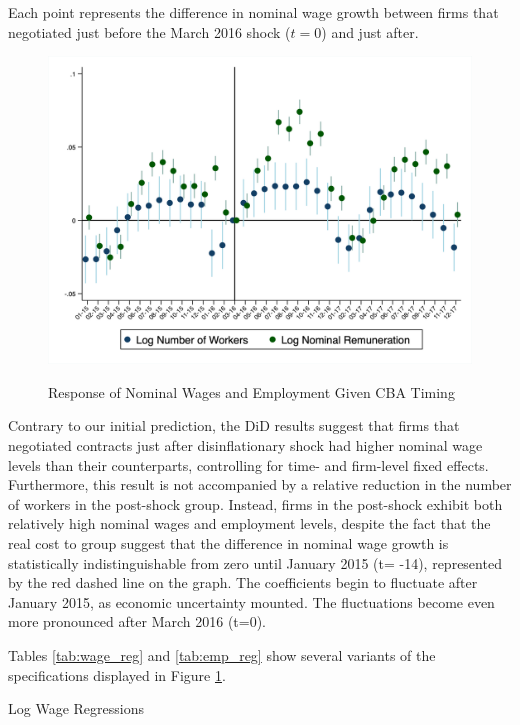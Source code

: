 \documentclass[12pt]{article}
\begin{document}
		 Each point represents the difference in nominal wage growth between firms that negotiated just before the March 2016 shock ($t=0$) and just after.
		\begin{figure}[!ht]
			\centering
			\caption{Response of Nominal Wages and Employment Given CBA Timing}
			\includegraphics[scale = .375]{tables-figures/DiD_Plots_Weighted_Employment_Rem.png}
			\label{fig:RegressionResults}
		\end{figure}
		Contrary to our initial prediction, the DiD results suggest that firms that negotiated contracts just after disinflationary shock had higher nominal wage levels than their counterparts, controlling for time- and firm-level fixed effects. Furthermore, this result is not accompanied by a relative reduction in the number of workers in the post-shock group. Instead, firms in the post-shock exhibit both relatively high nominal wages and employment levels, despite the fact that the real cost to group suggest that the difference in nominal wage growth is statistically indistinguishable from zero until January 2015 (t= -14), represented by the red dashed line on the graph. The coefficients begin to fluctuate after January 2015, as economic uncertainty mounted. The fluctuations become even more pronounced after March 2016 (t=0).


	Tables \ref{tab:wage_reg} and \ref{tab:emp_reg} show several variants of the specifications displayed in Figure \ref{fig:RegressionResults}. 
		\begin{table}[!ht]
				\caption{Log Wage Regressions}
				\label{tab:wage_reg}
				\tiny{}
		\end{table}
\end{document}
